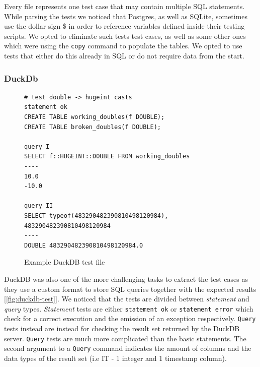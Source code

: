 \documentclass[acmsmall,nonacm]{acmart}
\begin{document}
Every file represents one test case that may contain multiple SQL statements. While parsing the tests we noticed that Postgres, as well as SQLite, sometimes use the dollar sign \$ in order to reference variables defined inside their testing scripts. We opted to eliminate such tests test cases, as well as some other ones which were using the \texttt{copy} command to populate the tables. We opted to use tests that either do this already in SQL or do not require data from the start.


\subsubsection*{DuckDb}
\begin{figure}[h!]
\begin{verbatim}
# test double -> hugeint casts
statement ok
CREATE TABLE working_doubles(f DOUBLE);
CREATE TABLE broken_doubles(f DOUBLE);

query I
SELECT f::HUGEINT::DOUBLE FROM working_doubles
----
10.0
-10.0

query II
SELECT typeof(483290482390810498120984), 483290482390810498120984
----
DOUBLE 483290482390810498120984.0
\end{verbatim}
\vspace{-0.3cm}
\caption{Example DuckDB test file}
\label{fig:duckdb-test}
\vspace{-0.3cm}
\end{figure}
DuckDB was also one of the more challenging tasks to extract the test cases as they use a custom format to store SQL queries together with the expected results [\autoref{fig:duckdb-test}]. We noticed that the tests are divided between \textit{statement} and \textit{query} types. \textit{Statement} tests are either \texttt{statement ok} or \texttt{statement error} which check for a correct execution and the emission of an exception respectively. \texttt{Query} tests instead are instead for checking the result set returned by the DuckDB server. \texttt{Query} tests are much more complicated than the basic statements. The second argument to a \texttt{Query} command indicates the amount of columns and the data types of the result set (i.e IT - 1 integer and 1 timestamp column).
\end{document}
